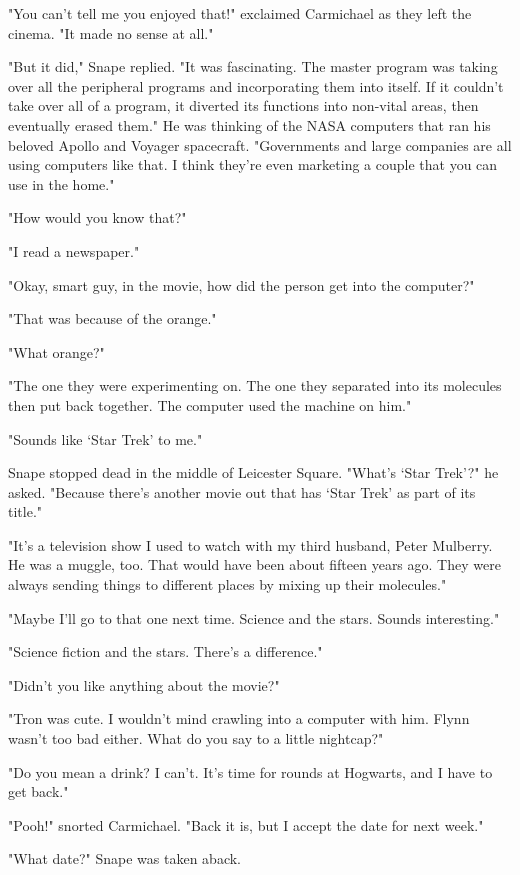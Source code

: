 "You can't tell me you enjoyed that!" exclaimed Carmichael as they left the cinema. "It made no sense at all."

"But it did," Snape replied. "It was fascinating. The master program was taking over all the peripheral programs and incorporating them into itself. If it couldn't take over all of a program, it diverted its functions into non-vital areas, then eventually erased them." He was thinking of the NASA computers that ran his beloved Apollo and Voyager spacecraft. "Governments and large companies are all using computers like that. I think they're even marketing a couple that you can use in the home."

"How would you know that?"

"I read a newspaper."

"Okay, smart guy, in the movie, how did the person get into the computer?"

"That was because of the orange."

"What orange?"

"The one they were experimenting on. The one they separated into its molecules then put back together. The computer used the machine on him."

"Sounds like `Star Trek' to me."

Snape stopped dead in the middle of Leicester Square. "What's `Star Trek'?" he asked. "Because there's another movie out that has `Star Trek' as part of its title."

"It's a television show I used to watch with my third husband, Peter Mulberry. He was a muggle, too. That would have been about fifteen years ago. They were always sending things to different places by mixing up their molecules."

"Maybe I'll go to that one next time. Science and the stars. Sounds interesting."

"Science fiction and the stars. There's a difference."

"Didn't you like anything about the movie?"

"Tron was cute. I wouldn't mind crawling into a computer with him. Flynn wasn't too bad either. What do you say to a little nightcap?"

"Do you mean a drink? I can't. It's time for rounds at Hogwarts, and I have to get back."

"Pooh!" snorted Carmichael. "Back it is, but I accept the date for next week."

"What date?" Snape was taken aback.

